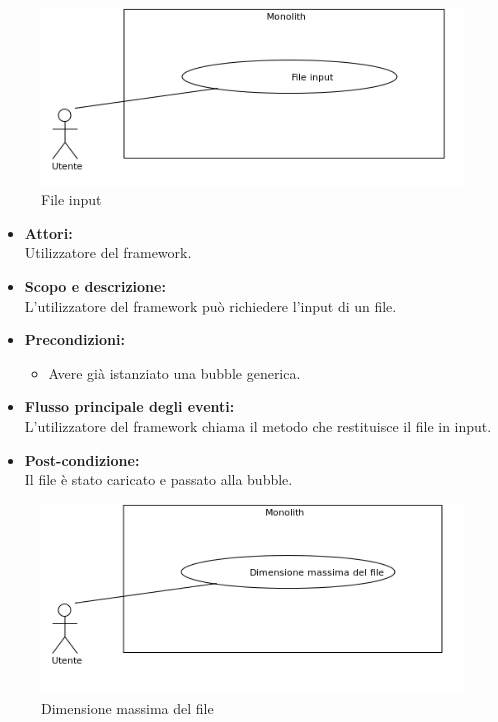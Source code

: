 
\begin{figure}[H]
	\centering
	\includegraphics[width=15cm]{../../documenti/AnalisiDeiRequisiti/Diagrammi_img/uc1_34.png}
	\caption{\UCCaption{} File input}
\end{figure}

\begin{itemize}
	\item \textbf{Attori:}
	\\Utilizzatore del framework.
	\item \textbf{Scopo e descrizione:} 
	\\L'utilizzatore del framework può richiedere l'input di un file.
	\item \textbf{Precondizioni:}
	\begin{itemize}
		\item Avere già istanziato una bubble generica.
	\end{itemize}
	\item \textbf{Flusso principale degli eventi:}
	\\L'utilizzatore del framework chiama il metodo che restituisce il file in input.
	\item \textbf{Post-condizione:}
	\\Il file è stato caricato e passato alla bubble.
\end{itemize}


\begin{figure}[H]
	\centering
	\includegraphics[width=15cm]{../../documenti/AnalisiDeiRequisiti/Diagrammi_img/uc1_11.png}
	\caption{\UCCaption{} Dimensione massima del file}
\end{figure}

